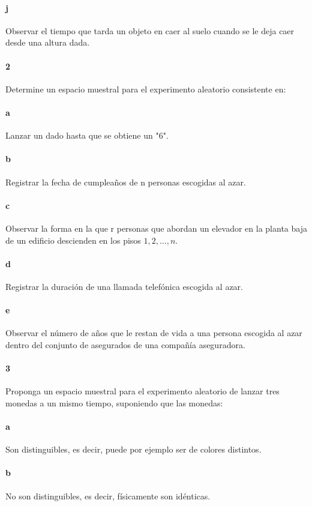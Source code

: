 \documentclass{article}
\begin{document}
\paragraph{j} Observar el tiempo que tarda un objeto en caer al suelo cuando se le deja caer desde una altura dada.

\paragraph{2} Determine un espacio muestral para el experimento aleatorio consistente en:
\paragraph{a} Lanzar un dado hasta que se obtiene un "6".
\paragraph{b} Registrar la fecha de cumpleaños de n personas escogidas al azar.
\paragraph{c} Observar la forma en la que r personas que abordan un elevador en la planta baja de un edificio descienden en los pisos $1, 2, \dots, n$.
\paragraph{d} Registrar la duración de una llamada telefónica escogida al azar.
\paragraph{e} Observar el número de años que le restan de vida a una persona escogida al azar dentro del conjunto de asegurados de una compañía aseguradora.
\paragraph{3} Proponga un espacio muestral para el experimento aleatorio de lanzar tres monedas a un mismo tiempo, suponiendo que las monedas:
\paragraph{a} Son distinguibles, es decir, puede por ejemplo ser de colores distintos.
\paragraph{b}No son distinguibles, es decir, físicamente son idénticas.
\end{document}
